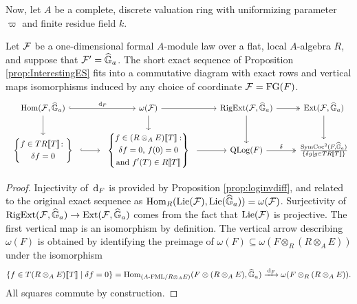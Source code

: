 \documentclass[../main.tex]{subfiles}
\begin{document}
Now, let $A$ be a complete, discrete valuation ring with 
uniformizing parameter $\varpi$ and finite residue field $k$. 
\begin{prop} \label{prop:ExplicitInterestingES}
  Let $\mathcal{F}$ be a one-dimensional formal $A$-module law over a flat, local
  $A$-algebra $R$, and suppose that $\mathcal{F}' = \widehat{\mathbb{G}}_a$.
  The short exact sequence of Proposition \ref{prop:InterestingES}
  fits into a commutative diagram with 
  exact rows and vertical maps isomorphisms induced by 
  any choice of coordinate $\mathcal{F} = \textnormal{FG}(F)$.
\begin{equation*}
\begin{tikzcd}[ampersand replacement=\&]
  {\Hom(\cF,\Ghat_a)} \& {\omega(\cF)} \& {\RigExt(\cF,\Ghat_a)} \&
  {\Ext(\cF,\Ghat_a)} \\ 
  \begin{array}{c} \left\{\begin{gathered} f \in TR\llbr T \rrbr \colon  \\  \delta f
    = 0\end{gathered}  \right\} \end{array} \& \begin{array}{c}
    \left\{\begin{gathered} f \in (R\otimes_A E)\llbr T \rrbr : \\ 
  \text{$\delta f = 0$, $f(0) = 0$} \\
    \text{and $f'(T) \in R\llbr T \rrbr$}\end{gathered} \right\} \end{array} \& {\QLog(F)} \&
    {\frac{\SymCoc^2(F, \Ghat_a)}{\{\delta g \mid g \in T R\llbr T \rrbr\}}}
	\arrow[hook, "{\dc_F}", from=1-1, to=1-2]
	\arrow[from=1-1, to=2-1]
	\arrow[from=1-2, to=1-3]
	\arrow[from=1-2, to=2-2]
	\arrow[two heads, from=1-3, to=1-4]
	\arrow[from=1-3, to=2-3]
	\arrow[from=1-4, to=2-4]
	\arrow[hook, from=2-1, to=2-2]
	\arrow[from=2-2, to=2-3]
	\arrow["\delta", two heads, from=2-3, to=2-4]
\end{tikzcd}
\end{equation*}
\begin{proof}
  Injectivity of $\, \mathrm{d}_F$ is provided by Proposition \ref{prop:loginvdiff},
  and related to the original exact sequence as $\operatorname{Hom}_R(\operatorname{Lie}(\mathcal{F}), \operatorname{Lie}(\widehat{\mathbb{G}}_a)) = 
  \omega(\mathcal{F})$.
  Surjectivity of $\operatorname {RigExt}(\mathcal{F}, \widehat{\mathbb{G}}_a) \to \operatorname{Ext}(\mathcal{F}, \widehat{\mathbb{G}}_a)$ comes from the
  fact that $\operatorname{Lie}(\mathcal{F})$ is projective. 
  The first vertical map is an isomorphism by definition. 
  The vertical arrow describing $\omega(F)$ is obtained by
  identifying the preimage of $\omega(F) \subseteq \omega(F \otimes_R (R
  \otimes_AE))$ under the isomorphism 
  \begin{equation*}
    \{f \in T(R \otimes_A E)\llbracket T \rrbracket \mid \delta f = 0\} = \operatorname{Hom}_{{({A}\text-\allowbreak\mathrm{FML}/{R \otimes_A E})}} (F \otimes (R \otimes_A E), \widehat{\mathbb{G}}_a) \xrightarrow{\, \mathrm{d}_F} \omega(F
    \otimes_R (R \otimes_AE)).
  \end{equation*}
  All squares commute by construction.
\end{proof}
\end{prop}
\end{document}
